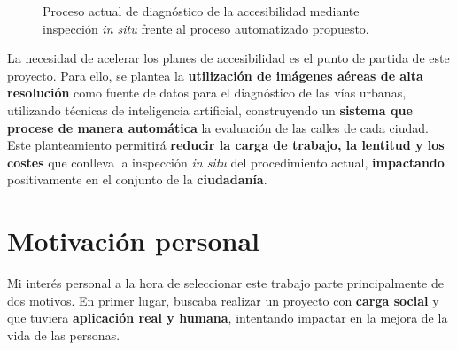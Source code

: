 \begin{figure}[htbp]

  \vspace{3mm}
  \caption{Proceso actual de diagnóstico de la accesibilidad mediante inspección \emph{in situ} frente al proceso automatizado propuesto.}
  \label{fig:proceso_actual_propuesto}
\end{figure}

La necesidad de acelerar los planes de accesibilidad es el punto de partida de este proyecto. Para ello, se plantea la \textbf{utilización de imágenes aéreas de alta resolución} como fuente de datos para el diagnóstico de las vías urbanas, utilizando técnicas de inteligencia artificial, construyendo un \textbf{sistema que procese de manera automática} la evaluación de las calles de cada ciudad.
\\

Este planteamiento permitirá \textbf{reducir la carga de trabajo, la lentitud y los costes} que conlleva la inspección \textit{in situ} del procedimiento actual, \textbf{impactando} positivamente en el conjunto de la \textbf{ciudadanía}.
\\

\section{Motivación personal}
Mi interés personal a la hora de seleccionar este trabajo parte principalmente de dos motivos. En primer lugar, buscaba realizar un proyecto con\textbf{ carga social} y que tuviera \textbf{aplicación real y humana}, intentando impactar en la mejora de la vida de las personas.
\\

